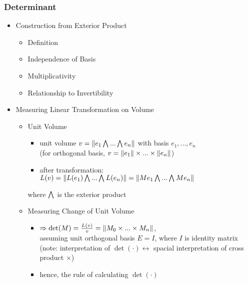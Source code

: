 \subsubsection{Determinant}
\begin{itemize}
\item Construction from Exterior Product
	\begin{itemize}
	\item Definition
	\item Independence of Basis
	\item Multiplicativity
	\item Relationship to Invertibility
	\end{itemize}
\item Measuring Linear Transformation on Volume
	\begin{itemize}
	\item Unit Volume
		\begin{itemize}
		\item unit volume $v=\norm{e_1 \extp ...\extp e_n}$ with basis $e_1,...,e_n$ \\
		(for orthogonal basis, $v=\lVert e_1\rVert\times...\times\lVert e_n\rVert$)
		\item after transformation: $L(v) = \norm{L(e_1)\extp...\extp L(e_n)} = \norm{Me_1\extp...\extp Me_n}$
		\end{itemize}
		where $\extp$ is the exterior product
	\item Measuring Change of Unit Volume
		\begin{itemize}
		\item $\Rightarrow \det(M) = \frac {L(v)}{v} = \lVert M_0\times...\times M_n\rVert$, \\
		assuming unit orthogonal basis $E=I$, where $I$ is identity matrix \\
		(note: interpretation of $\det(\cdot) \leftrightarrow$ spacial interpretation of cross product $\times$)
		\item hence, the rule of calculating $\det(\cdot)$ \\
		\end{itemize}
	\end{itemize}
	

\end{itemize}
